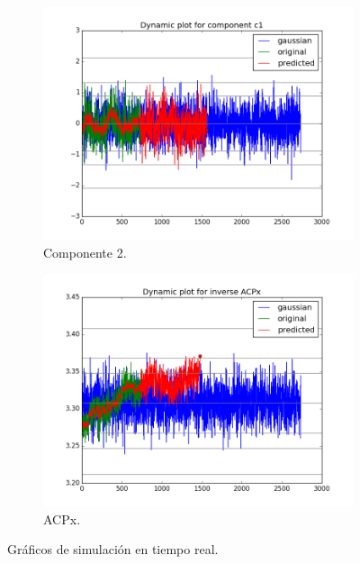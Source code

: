 \documentclass[11pt,spanish,listoffigures,listoftables]{tfgetsinf}
\begin{document}
        \begin{figure}[H]
            \centering
            \begin{subfigure}[h]{0.7\textwidth}
                \includegraphics[width=\textwidth]{matplotlib/c1_matplotlib_1.png}
                \caption{Componente 2.}
                \label{fig:c1_matplotlib}
            \end{subfigure}
            \begin{subfigure}[h]{0.7\textwidth}
                \includegraphics[width=\textwidth]{matplotlib/ACPx_matplotlib_1.png}
                \caption{ACPx.}
                \label{fig:ACPx_matplotlib}
            \end{subfigure}
            \caption{Gráficos de simulación en tiempo real.}
            \label{fig:matplotlib}
        \end{figure}
        
\end{document}
